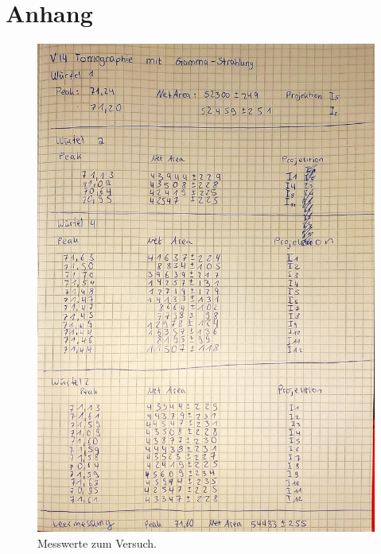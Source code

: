 \section{Anhang}\label{sec:Anhang}
\begin{figure}[h]
   \centering
    \includegraphics[scale=0.45]{Abbildungen/Kladde.pdf}
   \caption{Messwerte zum Versuch.}
\end{figure}
\pagebreak